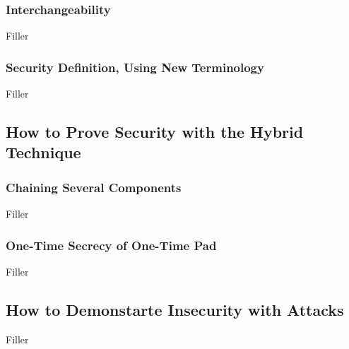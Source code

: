 \documentclass{article}
\begin{document}
\begin{adjustwidth}{2em}{}
\begin{adjustwidth}{2em}{}
				\subsubsection{Interchangeability}
				\begin{adjustwidth}{2em}{}
				Filler
				\end{adjustwidth}
				\subsubsection{Security Definition, Using New Terminology}
				\begin{adjustwidth}{2em}{}
				Filler
				\end{adjustwidth}
			\end{adjustwidth}
			\subsection{How to Prove Security with the Hybrid Technique}
			\begin{adjustwidth}{2em}{}
				\subsubsection{Chaining Several Components}
				\begin{adjustwidth}{2em}{}
				Filler
				\end{adjustwidth}
				\subsubsection{One-Time Secrecy of One-Time Pad}
				\begin{adjustwidth}{2em}{}
				Filler
				\end{adjustwidth}
			\end{adjustwidth}
			\subsection{How to Demonstarte Insecurity with Attacks}
			\begin{adjustwidth}{2em}{}
			Filler
			\end{adjustwidth}
		\end{adjustwidth}
	
\end{document}
